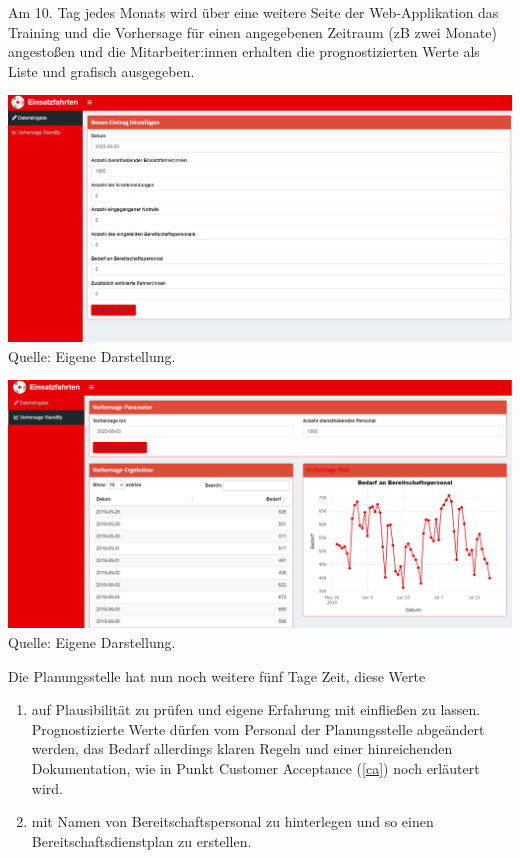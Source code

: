 Am 10. Tag jedes Monats wird über eine weitere Seite der Web-Applikation das Training und die Vorhersage für einen angegebenen Zeitraum (zB zwei Monate) angestoßen und die Mitarbeiter:innen erhalten die prognostizierten Werte als Liste und grafisch ausgegeben.

\begin{landscape}
\centering
{} 
\includegraphics[width=22cm]{01_resources/dataentry.png}\\
Quelle: Eigene Darstellung.
\label{fig:dataentry}
\end{landscape}
\FloatBarrier 
  
\begin{landscape}
\centering
{} 
\includegraphics[width=22cm]{01_resources/dataforecast.png}\\
Quelle: Eigene Darstellung.
\label{fig:forecast}
\end{landscape}
\FloatBarrier
 
Die Planungsstelle hat nun noch weitere fünf Tage Zeit, diese Werte 

 \begin{enumerate}
  \itemsep-8pt
   \item	auf Plausibilität zu prüfen und eigene Erfahrung mit einfließen zu lassen. Prognostizierte Werte dürfen vom Personal der Planungsstelle abgeändert werden, das Bedarf allerdings klaren Regeln und einer hinreichenden Dokumentation, wie in Punkt Customer Acceptance (\ref{ca}) noch erläutert wird.
   \item mit Namen von Bereitschaftspersonal zu hinterlegen und so einen Bereitschaftsdienstplan zu erstellen.
 \end{enumerate}
 
